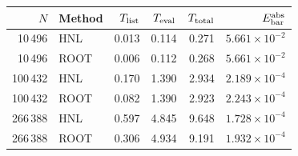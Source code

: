 \begin{tabular}{@{}rlrrrr@{}}
\toprule
$N$ & Method & $T_{\rm list}$ & $T_{\rm eval}$ & $T_{\rm total}$ & $E_{\rm bar}^{\rm abs}$\\
\midrule
10\,496 & HNL & 0.013 & 0.114 & 0.271 & $5.661\times10^{-2}$\\
10\,496 & ROOT & 0.006 & 0.112 & 0.268 & $5.661\times10^{-2}$\\
100\,432 & HNL & 0.170 & 1.390 & 2.934 & $2.189\times10^{-4}$\\
100\,432 & ROOT & 0.082 & 1.390 & 2.923 & $2.243\times10^{-4}$\\
266\,388 & HNL & 0.597 & 4.845 & 9.648 & $1.728\times10^{-4}$\\
266\,388 & ROOT & 0.306 & 4.934 & 9.191 & $1.932\times10^{-4}$\\
\bottomrule
\end{tabular}
